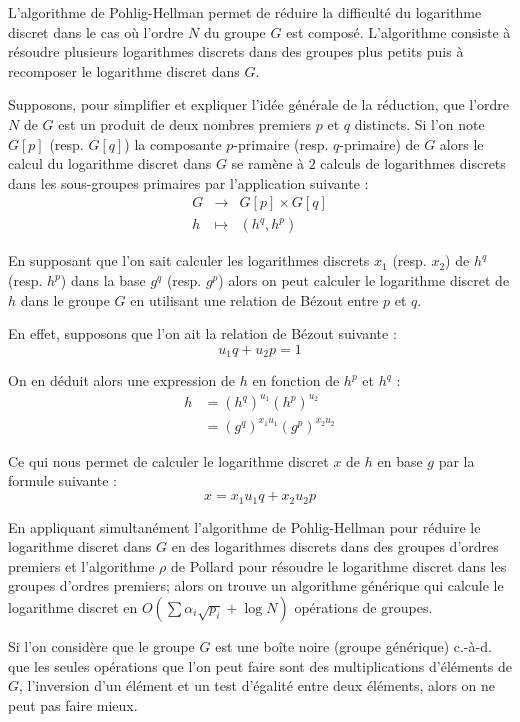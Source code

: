 \documentclass[a4paper]{article}
\theoremstyle{definition}
\theoremstyle{remark}
\numberwithin{equation}{section}
\begin{document}
L'algorithme de Pohlig-Hellman \cite{pohlig-hellman} permet de réduire la difficulté du logarithme discret dans le cas où l'ordre $N$ du groupe $G$ est composé. L'algorithme consiste à résoudre plusieurs logarithmes discrets dans des groupes plus petits puis à recomposer le logarithme discret dans $G$.

Supposons, pour simplifier et expliquer l'idée générale de la réduction, que l'ordre $N$ de $G$ est un produit de deux nombres premiers $p$ et $q$ distincts. Si l'on note $G[p]$ (resp. $G[q]$) la composante $p$-primaire (resp. $q$-primaire) de $G$ alors le calcul du logarithme discret dans $G$ se ramène à $2$ calculs de logarithmes discrets dans les sous-groupes primaires par l'application suivante :
\begin{equation*}
\begin{array}{lcl}
G & \longrightarrow & G[p] \times G[q] \\
h & \longmapsto & (h^q, h^p)
\end{array}
\end{equation*}

En supposant que l'on sait calculer les logarithmes discrets $x_1$ (resp. $x_2$) de $h^q$ (resp. $h^p$) dans la base $g^q$ (resp. $g^p$) alors on peut calculer le logarithme discret de $h$ dans le groupe $G$ en utilisant une relation de Bézout entre $p$ et $q$. 

En effet, supposons que l'on ait la relation de Bézout suivante :
$$u_1 q + u_2 p = 1$$

On en déduit alors une expression de $h$ en fonction de $h^p$ et $h^q$ :
\begin{align*}
h &= (h^q)^{u_1}(h^p)^{u_2} \\
  &= (g^q)^{x_1u_1}(g^p)^{x_2u_2}
\end{align*}

Ce qui nous permet de calculer le logarithme discret $x$ de $h$ en base $g$ par la formule suivante :
$$x = x_1 u_1 q + x_2 u_2 p$$

En appliquant simultanément l'algorithme de Pohlig-Hellman pour réduire le logarithme discret dans $G$ en des logarithmes discrets dans des groupes d'ordres premiers et l'algorithme $\rho$ de Pollard pour résoudre le logarithme discret dans les groupes d'ordres premiers; alors on trouve un algorithme générique qui calcule le logarithme discret en $O(\sum{\alpha_i\sqrt{p_i}}+\log N)$ opérations de groupes.

Si l'on considère que le groupe $G$ est une boîte noire (groupe générique) c.-à-d. que les seules opérations que l'on peut faire sont des multiplications d'éléments de $G$, l'inversion d'un élément et un test d'égalité entre deux éléments, alors on ne peut pas faire mieux.
\end{document}
